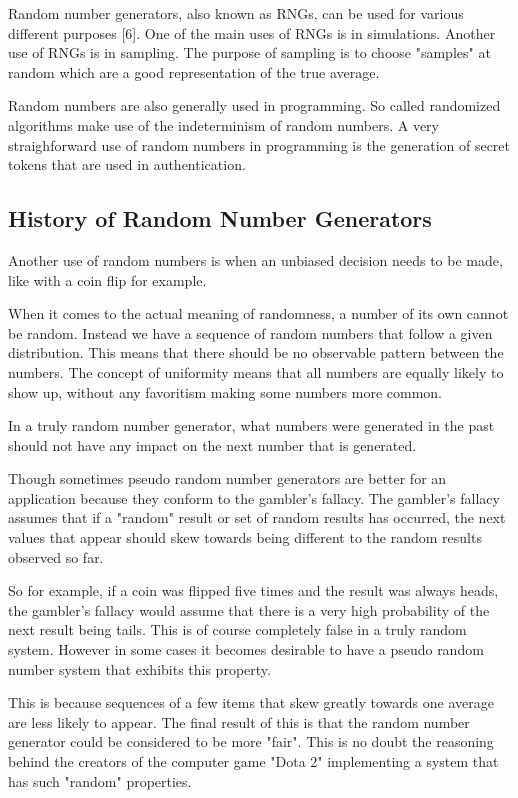 \documentclass{article}
\begin{document}
    Random number generators, also known as RNGs, can be used for various different purposes [6].
    One of the main uses of RNGs is in simulations.
    Another use of RNGs is in sampling. The purpose of sampling is to choose
    "samples" at random which are a good representation of the true average.

    Random numbers are also generally used in programming. So called randomized algorithms
    make use of the indeterminism of random numbers.
    A very straighforward use of random numbers in programming
    is the generation of secret tokens that are used in authentication.
        
    \subsection{History of Random Number Generators}

    Another use of random numbers is when an unbiased decision needs to be made,
    like with a coin flip for example.

    When it comes to the actual meaning of randomness, a number of its own cannot be random.
    Instead we have a sequence of random numbers that follow a given distribution.
    This means that there should be no observable pattern between the numbers.
    The concept of uniformity means that all numbers are equally likely to show up, without
    any favoritism making some numbers more common.
    
    In a truly random number generator, what numbers were generated in the past
    should not have any impact on the next number that is generated.

    Though sometimes pseudo random number generators are better for an application
    because they conform to the gambler's fallacy.
    The gambler's fallacy assumes that if a "random" result or set of random
    results has occurred, the next values that appear should skew towards being
    different to the random results observed so far.

    So for example, if a coin was flipped five times and the result was always heads,
    the gambler's fallacy would assume that there is a very high probability
    of the next result being tails. This is of course completely false in
    a truly random system.
    However in some cases it becomes desirable to have a pseudo random number system
    that exhibits this property.

    This is because sequences of a few items that skew greatly towards one average
    are less likely to appear.
    The final result of this is that the random number generator could be considered
    to be more "fair".
    This is no doubt the reasoning behind the creators of the computer game "Dota 2"
    implementing a system that has such "random" properties.
\end{document}
